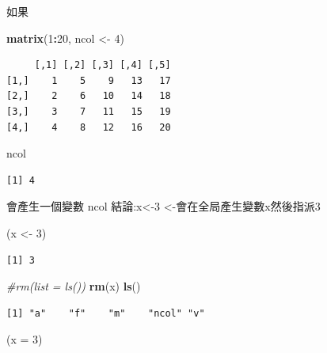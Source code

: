 \documentclass[]{book}
\newenvironment{Shaded}{\begin{snugshade}}{\end{snugshade}}
\newcommand{\CommentTok}[1]{\textcolor[rgb]{0.56,0.35,0.01}{\textit{#1}}}
\newcommand{\DataTypeTok}[1]{\textcolor[rgb]{0.13,0.29,0.53}{#1}}
\newcommand{\DecValTok}[1]{\textcolor[rgb]{0.00,0.00,0.81}{#1}}
\newcommand{\KeywordTok}[1]{\textcolor[rgb]{0.13,0.29,0.53}{\textbf{#1}}}
\newcommand{\NormalTok}[1]{#1}
\newcommand{\OperatorTok}[1]{\textcolor[rgb]{0.81,0.36,0.00}{\textbf{#1}}}
\newcommand{\StringTok}[1]{\textcolor[rgb]{0.31,0.60,0.02}{#1}}
\theoremstyle{definition}
\theoremstyle{definition}
\theoremstyle{definition}
\theoremstyle{remark}
\begin{document}
如果

\begin{Shaded}
\begin{Highlighting}[]
\KeywordTok{matrix}\NormalTok{(}\DecValTok{1}\OperatorTok{:}\DecValTok{20}\NormalTok{, ncol <-}\StringTok{ }\DecValTok{4}\NormalTok{)}
\end{Highlighting}
\end{Shaded}

\begin{verbatim}
     [,1] [,2] [,3] [,4] [,5]
[1,]    1    5    9   13   17
[2,]    2    6   10   14   18
[3,]    3    7   11   15   19
[4,]    4    8   12   16   20
\end{verbatim}

\begin{Shaded}
\begin{Highlighting}[]
\NormalTok{ncol}
\end{Highlighting}
\end{Shaded}

\begin{verbatim}
[1] 4
\end{verbatim}

會產生一個變數 ncol 結論:x\textless{}-3
\textless{}-會在全局產生變數x然後指派3

\begin{Shaded}
\begin{Highlighting}[]
\NormalTok{(x <-}\StringTok{ }\DecValTok{3}\NormalTok{)}
\end{Highlighting}
\end{Shaded}

\begin{verbatim}
[1] 3
\end{verbatim}

\begin{Shaded}
\begin{Highlighting}[]
\CommentTok{#rm(list = ls())}
\KeywordTok{rm}\NormalTok{(x)}
\KeywordTok{ls}\NormalTok{()}
\end{Highlighting}
\end{Shaded}

\begin{verbatim}
[1] "a"    "f"    "m"    "ncol" "v"   
\end{verbatim}

\begin{Shaded}
\begin{Highlighting}[]
\NormalTok{(}\DataTypeTok{x =} \DecValTok{3}\NormalTok{)}
\end{Highlighting}
\end{Shaded}
\end{document}
